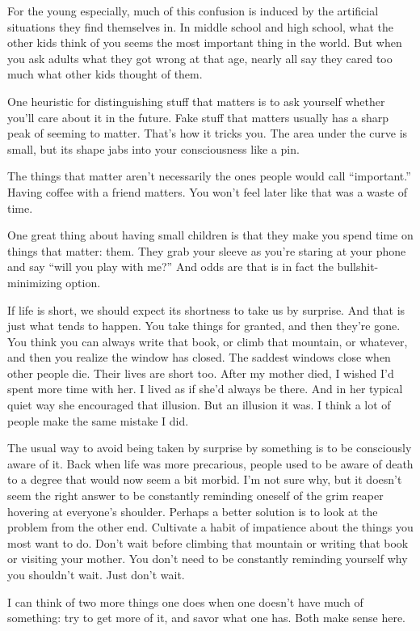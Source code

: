 \documentclass[12pt]{book}
\begin{document}
For the young especially, much of this confusion is induced by the
artificial situations they find themselves in. In middle school and high
school, what the other kids think of you seems the most important thing
in the world. But when you ask adults what they got wrong at that age,
nearly all say they cared too much what other kids thought of them.

One heuristic for distinguishing stuff that matters is to ask yourself
whether you'll care about it in the future. Fake stuff that matters
usually has a sharp peak of seeming to matter. That's how it tricks you.
The area under the curve is small, but its shape jabs into your
consciousness like a pin.

The things that matter aren't necessarily the ones people would call
``important.'' Having coffee with a friend matters. You won't feel later
like that was a waste of time.

One great thing about having small children is that they make you spend
time on things that matter: them. They grab your sleeve as you're
staring at your phone and say ``will you play with me?'' And odds are
that is in fact the bullshit-minimizing option.

If life is short, we should expect its shortness to take us by surprise.
And that is just what tends to happen. You take things for granted, and
then they're gone. You think you can always write that book, or climb
that mountain, or whatever, and then you realize the window has closed.
The saddest windows close when other people die. Their lives are short
too. After my mother died, I wished I'd spent more time with her. I
lived as if she'd always be there. And in her typical quiet way she
encouraged that illusion. But an illusion it was. I think a lot of
people make the same mistake I did.

The usual way to avoid being taken by surprise by something is to be
consciously aware of it. Back when life was more precarious, people used
to be aware of death to a degree that would now seem a bit morbid. I'm
not sure why, but it doesn't seem the right answer to be constantly
reminding oneself of the grim reaper hovering at everyone's shoulder.
Perhaps a better solution is to look at the problem from the other end.
Cultivate a habit of impatience about the things you most want to do.
Don't wait before climbing that mountain or writing that book or
visiting your mother. You don't need to be constantly reminding yourself
why you shouldn't wait. Just don't wait.

I can think of two more things one does when one doesn't have much of
something: try to get more of it, and savor what one has. Both make
sense here.
\end{document}
